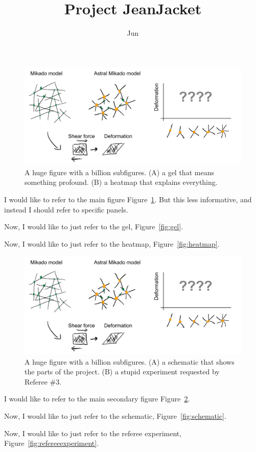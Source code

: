 \documentclass[onecolumn,11pt]{article}
\title{Project JeanJacket}
\author[a]{Jun}
\affil[a]{University of California Irvine}
\date{} %
\begin{document}
\maketitle




\begin{figure}[ht]
        \centering
        \includegraphics[width=4.5in]{figures/figJeanJacket.pdf}


        \caption{A huge figure with a billion subfigures. 
        (A) a gel that means something profound. 
        (B) a heatmap that explains everything.}
        \label{fig:main_conclusion}
\end{figure}
    

I would like to refer to the main figure Figure~\ref{fig:main_conclusion}. But this less informative, and instead I should refer to specific panels.

Now, I would like to just refer to the gel, Figure~\ref{fig:gel}.

Now, I would like to just refer to the heatmap, Figure~\ref{fig:heatmap}.




\newpage
\begin{figure}[ht]
        \centering
        \includegraphics[width=4.5in]{figures/figJeanJacket.pdf}
        \caption{A huge figure with a billion subfigures. 
        (A) a schematic that shows the parts of the project. 
        (B) a stupid experiment requested by Referee \#3.}
        \label{fig:secondaryconclusion}
\end{figure}

I would like to refer to the main secondary figure Figure~\ref{fig:secondaryconclusion}.

Now, I would like to just refer to the schematic, Figure~\ref{fig:schematic}.

Now, I would like to just refer to the referee experiment, Figure~\ref{fig:refereeexperiment}.
\end{document}
